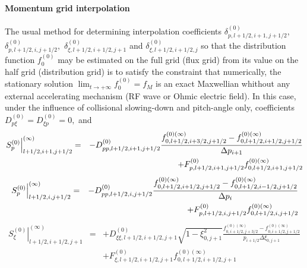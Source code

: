 

\label{fpgridinterpolation}

\paragraph{Momentum grid interpolation}

The usual method for determining interpolation coefficients $\delta
_{p,l+1/2,i+1,j+1/2}^{\left( 0\right) },$ $\delta _{p,l+1/2,i,j+1/2}^{\left(
0\right) },$ $\delta _{\xi ,l+1/2,i+1/2,j+1}^{\left( 0\right) }$ and $\delta
_{\xi ,l+1/2,i+1/2,j}^{\left( 0\right) }$ so that the distribution function $%
f_{0}^{\left( 0\right) }$ may be estimated on the full grid (flux grid) from
its value on the half grid (distribution grid) is to satisfy the constraint
that numerically, the stationary solution $\lim_{t\rightarrow +\infty
}f_{0}^{\left( 0\right) }=f_{M}$ is an exact Maxwellian whithout any
external accelerating mechanism (RF wave or Ohmic electric field). In this
case, under the influence of collisional slowing-down and pitch-angle only,
coefficients $D_{p\xi }^{\left( 0\right) }=D_{\xi p}^{\left( 0\right) }=0,$
and
\begin{eqnarray}
\left. S_{p}^{\left( 0\right) }\right| _{l+1/2,i+1,j+1/2}^{(\infty )}
&=&-D_{pp,l+1/2,i+1,j+1/2}^{\left( 0\right) }\frac{f_{0,l+1/2,i+3/2,j+1/2}^{%
\left( 0\right) (\infty )}-f_{0,l+1/2,i+1/2,j+1/2}^{\left( 0\right) (\infty
)}}{\Delta p_{i+1}}  \nonumber \\
&&+F_{p,l+1/2,i+1,j+1/2}^{\left( 0\right) }f_{0,l+1/2,i+1,j+1/2}^{\left(
0\right) (\infty )}
\end{eqnarray}
\begin{eqnarray}
\left. S_{p}^{\left( 0\right) }\right| _{l+1/2,i,j+1/2}^{(\infty )}
&=&-D_{pp,l+1/2,i,j+1/2}^{\left( 0\right) }\frac{f_{0,l+1/2,i+1/2,j+1/2}^{%
\left( 0\right) (\infty )}-f_{0,l+1/2,i-1/2,j+1/2}^{\left( 0\right) (\infty
)}}{\Delta p_{i}}  \nonumber \\
&&+F_{p,l+1/2,i,j+1/2}^{\left( 0\right) }f_{0,l+1/2,i,j+1/2}^{\left(
0\right) (\infty )}
\end{eqnarray}
\begin{eqnarray}
\left. S_{\xi }^{\left( 0\right) }\right| _{l+1/2,i+1/2,j+1}^{(\infty )}
&=&+D_{\xi \xi ,l+1/2,i+1/2,j+1}^{\left( 0\right) }\sqrt{1-\xi _{0,j+1}^{2}}%
\frac{f_{0,i+1/2,j+3/2}^{\left( 0\right) (\infty
)}-f_{0,i+1/2,j+1/2}^{\left( 0\right) (\infty )}}{p_{i+1/2}\Delta \xi
_{0,j+1}}  \nonumber \\
&&+F_{\xi ,l+1/2,i+1/2,j+1}^{\left( 0\right) }f_{0,l+1/2,i+1/2,j+1}^{\left(
0\right) (\infty )}
\end{eqnarray}
